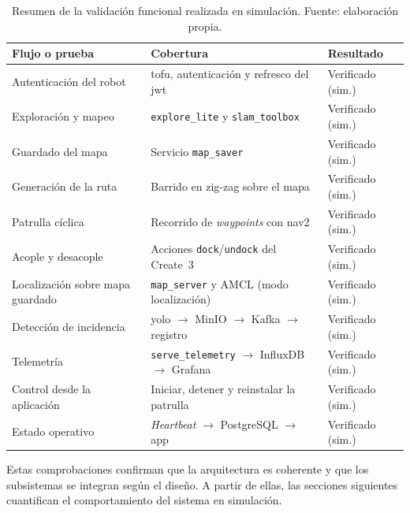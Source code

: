 \begin{table}[htbp]
  \centering
  \small
  \caption{Resumen de la validación funcional realizada en simulación. Fuente:
  elaboración propia.}
  \label{tab:validacion}
  \begin{tabular}{@{}>{\raggedright\arraybackslash}p{4.3cm}
                     >{\raggedright\arraybackslash}p{6.2cm}
                     >{\raggedright\arraybackslash}p{2.7cm}@{}}
    \toprule
    \textbf{Flujo o prueba} & \textbf{Cobertura} & \textbf{Resultado} \\
    \midrule
    Autenticación del robot & \gls{tofu}, autenticación y refresco del \gls{jwt} &
    Verificado (sim.) \\
    \addlinespace[3pt]
    Exploración y mapeo & \texttt{explore\_lite} y \texttt{slam\_toolbox} &
    Verificado (sim.) \\
    \addlinespace[3pt]
    Guardado del mapa & Servicio \texttt{map\_saver} &
    Verificado (sim.) \\
    \addlinespace[3pt]
    Generación de la ruta & Barrido en zig-zag sobre el mapa &
    Verificado (sim.) \\
    \addlinespace[3pt]
    Patrulla cíclica & Recorrido de \textit{waypoints} con \gls{nav2} &
    Verificado (sim.) \\
    \addlinespace[3pt]
    Acople y desacople & Acciones \texttt{dock}/\texttt{undock} del Create~3 &
    Verificado (sim.) \\
    \addlinespace[3pt]
    Localización sobre mapa guardado & \texttt{map\_server} y AMCL (modo localización) &
    Verificado (sim.) \\
    \addlinespace[3pt]
    Detección de incidencia & \gls{yolo} $\rightarrow$ MinIO $\rightarrow$ Kafka
    $\rightarrow$ registro & Verificado (sim.) \\
    \addlinespace[3pt]
    Telemetría & \texttt{serve\_telemetry} $\rightarrow$ InfluxDB $\rightarrow$ Grafana &
    Verificado (sim.) \\
    \addlinespace[3pt]
    Control desde la aplicación & Iniciar, detener y reinstalar la patrulla &
    Verificado (sim.) \\
    \addlinespace[3pt]
    Estado operativo & \textit{Heartbeat} $\rightarrow$ PostgreSQL $\rightarrow$ app &
    Verificado (sim.) \\
    \bottomrule
  \end{tabular}
\end{table}

Estas comprobaciones confirman que la arquitectura es coherente y que los subsistemas se
integran según el diseño. A partir de ellas, las secciones siguientes cuantifican el
comportamiento del sistema en simulación.

